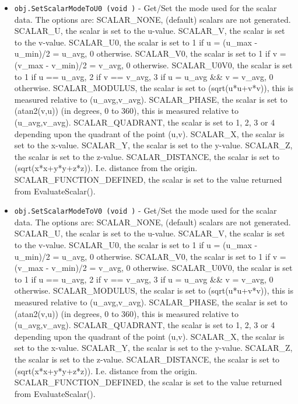 \begin{itemize}
\item  \verb|obj.SetScalarModeToU0 (void )| -  Get/Set the mode used for the scalar data.  The options are:
 SCALAR\_NONE, (default) scalars are not generated.
 SCALAR\_U, the scalar is set to the u-value. 
 SCALAR\_V, the scalar is set to the v-value.
 SCALAR\_U0, the scalar is set to 1 if u = (u\_max - u\_min)/2 = u\_avg, 0 otherwise.
 SCALAR\_V0, the scalar is set to 1 if v = (v\_max - v\_min)/2 = v\_avg, 0 otherwise.
 SCALAR\_U0V0, the scalar is 
   set to 1 if u == u\_avg, 2 if v == v\_avg, 3 if u = u\_avg \&\& v = v\_avg, 0 otherwise.
 SCALAR\_MODULUS, the scalar is set to (sqrt(u*u+v*v)), this is measured relative to (u\_avg,v\_avg).
 SCALAR\_PHASE, the scalar is set to (atan2(v,u)) (in degrees, 0 to 360), this is measured relative to (u\_avg,v\_avg).
 SCALAR\_QUADRANT, the scalar is set to 1, 2, 3 or 4 
   depending upon the quadrant of the point (u,v).
 SCALAR\_X, the scalar is set to the x-value. 
 SCALAR\_Y, the scalar is set to the y-value. 
 SCALAR\_Z, the scalar is set to the z-value. 
 SCALAR\_DISTANCE, the scalar is set to (sqrt(x*x+y*y+z*z)). I.e. distance from the origin.
 SCALAR\_FUNCTION\_DEFINED, the scalar is set to the value returned from EvaluateScalar().

\item  \verb|obj.SetScalarModeToV0 (void )| -  Get/Set the mode used for the scalar data.  The options are:
 SCALAR\_NONE, (default) scalars are not generated.
 SCALAR\_U, the scalar is set to the u-value. 
 SCALAR\_V, the scalar is set to the v-value.
 SCALAR\_U0, the scalar is set to 1 if u = (u\_max - u\_min)/2 = u\_avg, 0 otherwise.
 SCALAR\_V0, the scalar is set to 1 if v = (v\_max - v\_min)/2 = v\_avg, 0 otherwise.
 SCALAR\_U0V0, the scalar is 
   set to 1 if u == u\_avg, 2 if v == v\_avg, 3 if u = u\_avg \&\& v = v\_avg, 0 otherwise.
 SCALAR\_MODULUS, the scalar is set to (sqrt(u*u+v*v)), this is measured relative to (u\_avg,v\_avg).
 SCALAR\_PHASE, the scalar is set to (atan2(v,u)) (in degrees, 0 to 360), this is measured relative to (u\_avg,v\_avg).
 SCALAR\_QUADRANT, the scalar is set to 1, 2, 3 or 4 
   depending upon the quadrant of the point (u,v).
 SCALAR\_X, the scalar is set to the x-value. 
 SCALAR\_Y, the scalar is set to the y-value. 
 SCALAR\_Z, the scalar is set to the z-value. 
 SCALAR\_DISTANCE, the scalar is set to (sqrt(x*x+y*y+z*z)). I.e. distance from the origin.
 SCALAR\_FUNCTION\_DEFINED, the scalar is set to the value returned from EvaluateScalar().


\end{itemize}
